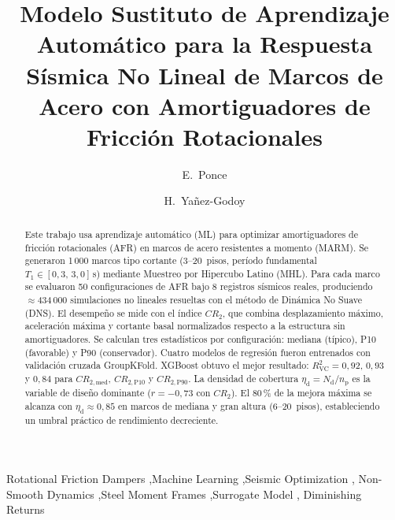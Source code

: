 \documentclass[preprint,12pt,authoryear]{elsarticle}
\newcommand{\CR}[1]{CR_{2,\text{#1}}}
\newcommand{\Rsq}{R^{2}_{\mathrm{VC}}}
\newcommand{\nd}{N_{\mathrm{d}}}
\newcommand{\np}{n_{\mathrm{p}}}
\newcommand{\etad}{\eta_{\mathrm{d}}}
\begin{document}
\begin{frontmatter}

\title{Modelo Sustituto de Aprendizaje Automático para la Respuesta Sísmica
       No Lineal de Marcos de Acero con Amortiguadores de Fricción Rotacionales}

\author[uaq]{E.~Ponce}
\author[i2m]{H.~Yañez-Godoy}

\address[uaq]{Universidad Autónoma de Querétaro, Facultad de Ingeniería,
              Cerro de las Campanas s/n, Querétaro, México}
\address[i2m]{Arts et Metiers Institute of Technology, University of Bordeaux,
              Centre National de la Recherche Scientifique (CNRS),
              Bordeaux INP, I2M, UMR 5295, 33400 Talence, France}

\begin{abstract}
Este trabajo usa aprendizaje automático (ML) para optimizar amortiguadores de fricción 
rotacionales (AFR) en marcos de acero resistentes a momento (MARM). Se generaron 1\,000 marcos 
tipo cortante (3--20~pisos, período fundamental $T_1 \in [0{,}3,\,3{,}0]$\,s) mediante 
Muestreo por Hipercubo Latino (MHL). Para cada marco se evaluaron 50 configuraciones de AFR 
bajo 8 registros sísmicos reales, produciendo $\approx$434\,000 simulaciones no lineales 
resueltas con el método de Dinámica No Suave (DNS). El desempeño se mide con el índice $CR_2$, 
que combina desplazamiento máximo, aceleración máxima y cortante basal normalizados respecto 
a la estructura sin amortiguadores. Se calculan tres estadísticos por configuración: mediana 
(típico), P10 (favorable) y P90 (conservador). Cuatro modelos de regresión fueron entrenados 
con validación cruzada GroupKFold. XGBoost obtuvo el mejor resultado: $\Rsq = 0{,}92$, 
$0{,}93$ y $0{,}84$ para $\CR{med}$, $\CR{P10}$ y $\CR{P90}$. La densidad de cobertura 
$\etad = \nd/\np$ es la variable de diseño dominante ($r=-0{,}73$ con $CR_2$). El 80\,\% 
de la mejora máxima se alcanza con $\etad \approx 0{,}85$ en marcos de mediana y gran altura 
(6--20~pisos), estableciendo un umbral práctico de rendimiento decreciente.
\end{abstract}

\begin{keyword}
Rotational Friction Dampers \sep Machine Learning \sep Seismic Optimization \sep
Non-Smooth Dynamics \sep Steel Moment Frames \sep Surrogate Model \sep
Diminishing Returns
\end{keyword}

\end{frontmatter}
\end{document}
